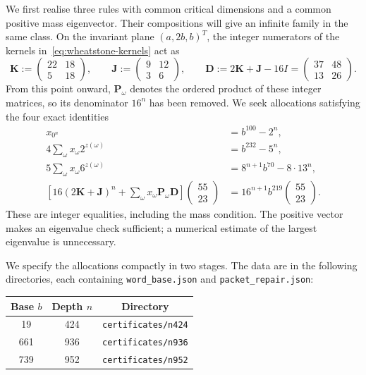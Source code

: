 We first realise three rules with common critical dimensions and a common positive mass eigenvector. Their compositions will give an infinite family in the same class.
On the invariant plane $(a,2b,b)^T$, the integer numerators of the kernels in~\eqref{eq:wheatstone-kernels} act as
\[
 \mathbf K:=\begin{pmatrix}22&18\\5&18\end{pmatrix},\qquad
 \mathbf J:=\begin{pmatrix}9&12\\3&6\end{pmatrix},\qquad
 \mathbf D:=2\mathbf K+\mathbf J-16I
 =\begin{pmatrix}37&48\\13&26\end{pmatrix}.
\]
From this point onward, $\mathbf P_\omega$ denotes the ordered product of these integer matrices, so its denominator $16^n$ has been removed.
We seek allocations satisfying the four exact identities
\begin{align}
 x_{0^n}&=b^{100}-2^n,\label{eq:certificate-length}\\
 4\sum_\omega x_\omega2^{z(\omega)}&=b^{232}-5^n,\label{eq:certificate-volume}\\
 5\sum_\omega x_\omega6^{z(\omega)}&=8^{n+1}b^{70}-8\cdot13^n,\label{eq:certificate-thermal}\\
 \left[16(2\mathbf K+\mathbf J)^n+
 \sum_\omega x_\omega\mathbf P_\omega\mathbf D\right]
 \begin{pmatrix}55\\23\end{pmatrix}
 &=16^{n+1}b^{219}\begin{pmatrix}55\\23\end{pmatrix}.
 \label{eq:certificate-mass}
\end{align}
These are integer equalities, including the mass condition. The positive vector makes an eigenvalue check sufficient; a numerical estimate of the largest eigenvalue is unnecessary.

We specify the allocations compactly in two stages. The data are in the following directories, each containing \texttt{word\_base.json} and \texttt{packet\_repair.json}:
\begin{center}
\begin{tabular}{ccc}
\toprule
Base $b$ & Depth $n$ & Directory\\
\midrule
19 & 424 & \texttt{certificates/n424}\\
661 & 936 & \texttt{certificates/n936}\\
739 & 952 & \texttt{certificates/n952}\\
\bottomrule
\end{tabular}
\end{center}

